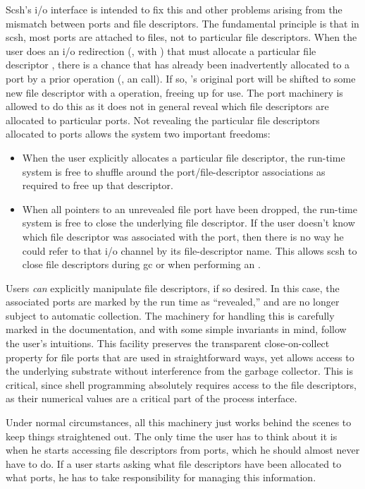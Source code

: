 Scsh's {\Unix} i/o interface is intended to fix this and 
other problems arising from the mismatch between ports and file descriptors.
The fundamental principle is that in scsh, most ports are attached to files,
not to particular file descriptors.
When the user does an i/o redirection (\eg, with )
that must allocate a particular file descriptor , there is a chance
that  has already been inadvertently allocated to a port by a prior
operation (\eg, an  call).
If so, 's original port will be shifted to some new file descriptor 
with a  operation, freeing up  for use.
The port machinery is allowed to do this as it does not in general
reveal which file descriptors are allocated to particular {\Scheme} ports.
Not revealing the particular file descriptors allocated to {\Scheme}
ports allows the system two important freedoms:
\begin{itemize}
\item When the user explicitly allocates a particular file descriptor,
      the run-time system is free to shuffle around the port/file-descriptor
      associations as required to free up that descriptor.
\item When all pointers to an unrevealed file port have been dropped, 
      the run-time system is free to close the underlying file descriptor.
      If the user doesn't know which file descriptor was associated with the
      port, then there is no way he could refer to that i/o channel by its
      file-descriptor name.
      This allows scsh to close file descriptors during gc or when
      performing an .
\end{itemize}
Users {\em can\/} explicitly manipulate file descriptors, if so desired.
In this case, the associated ports are marked by the run time as ``revealed,''
and are no longer subject to automatic collection.
The machinery for handling this is carefully marked in the documentation, 
and with some simple invariants in mind, follow the user's intuitions.
This facility preserves the transparent close-on-collect property
for file ports that are used in straightforward ways, yet allows
access to the underlying {\Unix} substrate without interference from
the garbage collector. This is critical, since shell programming
absolutely requires access to the {\Unix} file descriptors, as their
numerical values are a critical part of the process interface.

Under normal circumstances, all this machinery just works behind the scenes
to keep things straightened out. The only time the user has to think about
it is when he starts accessing file descriptors from ports, which he should
almost never have to do. If a user starts asking what file descriptors
have been allocated to what ports, he has to take responsibility for managing
this information.

